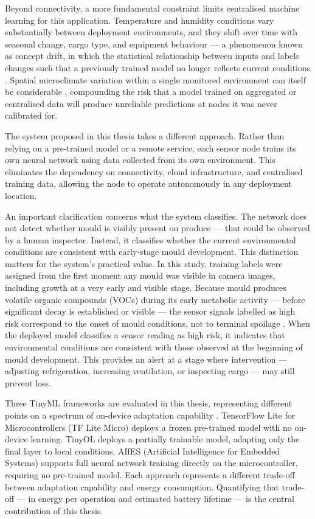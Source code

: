 Beyond connectivity, a more fundamental constraint limits centralised machine learning for this application. Temperature and humidity conditions vary substantially between deployment environments, and they shift over time with seasonal change, cargo type, and equipment behaviour --- a phenomenon known as concept drift, in which the statistical relationship between inputs and labels changes such that a previously trained model no longer reflects current conditions \cite{Bayram2022, Ilic2023}. Spatial microclimate variation within a single monitored environment can itself be considerable \cite{Ferentinos2017}, compounding the risk that a model trained on aggregated or centralised data will produce unreliable predictions at nodes it was never calibrated for.

The system proposed in this thesis takes a different approach. Rather than relying on a pre-trained model or a remote service, each sensor node trains its own neural network using data collected from its own environment. This eliminates the dependency on connectivity, cloud infrastructure, and centralised training data, allowing the node to operate autonomously in any deployment location.

An important clarification concerns what the system classifies. The network does not detect whether mould is visibly present on produce --- that could be observed by a human inspector. Instead, it classifies whether the current environmental conditions are consistent with early-stage mould development. This distinction matters for the system's practical value. In this study, training labels were assigned from the first moment any mould was visible in camera images, including growth at a very early and visible stage. Because mould produces volatile organic compounds (VOCs) during its early metabolic activity --- before significant decay is established or visible --- the sensor signals labelled as high risk correspond to the onset of mould conditions, not to terminal spoilage \cite{Yang2025, Ma2023}. When the deployed model classifies a sensor reading as high risk, it indicates that environmental conditions are consistent with those observed at the beginning of mould development. This provides an alert at a stage where intervention --- adjusting refrigeration, increasing ventilation, or inspecting cargo --- may still prevent loss.

Three TinyML frameworks are evaluated in this thesis, representing different points on a spectrum of on-device adaptation capability \cite{Dutta2021, Ficco2024}. TensorFlow Lite for Microcontrollers (TF Lite Micro) \cite{David2021} deploys a frozen pre-trained model with no on-device learning. TinyOL \cite{Disabato2021} deploys a partially trainable model, adapting only the final layer to local conditions. AIfES (Artificial Intelligence for Embedded Systems) \cite{Wulfert2024} supports full neural network training directly on the microcontroller, requiring no pre-trained model. Each approach represents a different trade-off between adaptation capability and energy consumption. Quantifying that trade-off --- in energy per operation and estimated battery lifetime --- is the central contribution of this thesis.

